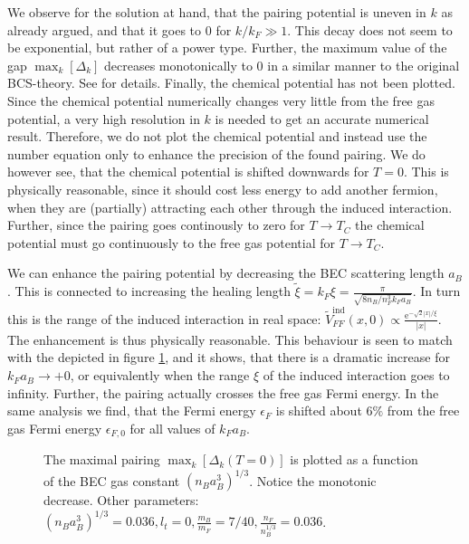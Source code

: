  We observe for the solution at hand, that the pairing potential is uneven in $k$ as already argued, and that it goes to 0 for $k/k_F \gg 1$. This decay does not seem to be exponential, but rather of a power type. Further, the maximum value of the gap $\max_k[\Delta_k]$ decreases monotonically to 0 in a similar manner to the original BCS-theory. See \cite{Tinkham,BruusFlensberg,PlischkeStatPhys} for details. Finally, the chemical potential has not been plotted. Since the chemical potential numerically changes very little from the free gas potential, a very high resolution in $k$ is needed to get an accurate numerical result. Therefore, we do not plot the chemical potential and instead use the number equation only to enhance the precision of the found pairing. We do however see, that the chemical potential is shifted downwards for $T=0$. This is physically reasonable, since it should cost less energy to add another fermion, when they are (partially) attracting each other through the induced interaction. Further, since the pairing goes continously to zero for $T\to T_C$ the chemical potential must go continuously to the free gas potential for $T\to T_C$. 

 We can enhance the pairing potential by decreasing the BEC scattering length $a_B$. This is connected to increasing the healing length $\tilde{\xi} = k_F\xi = \frac{\pi}{\sqrt{8 n_B/n_F^3 k_Fa_B}}$. In turn this is the range of the induced interaction in real space: $\tilde{V}_{FF}^\text{ind}(x,0) \propto \frac{\text{e}^{-\sqrt{2}|x|/\xi}}{|x|}$. The enhancement is thus physically reasonable. This behaviour is seen to match with the depicted in figure \ref{fig.maxkDeltakaBdepend}, and it shows, that there is a dramatic increase for $k_Fa_B \to +0$, or equivalently when the range $\xi$ of the induced interaction goes to infinity. Further, the pairing actually crosses the free gas Fermi energy. In the same analysis we find, that the Fermi energy $\epsilon_F$ is shifted about $6\%$ from the free gas Fermi energy $\epsilon_{F,0}$ for all values of $k_F a_B$.  

\begin{figure} 
\begin{center}  
  
\caption{The maximal pairing $\max_k[\Delta_k(T=0)]$ is plotted as a function of the BEC gas constant $(n_Ba_B^3)^{1/3}$. Notice the monotonic decrease. Other parameters: $(n_Ba_B^3)^{1/3} = 0.036, l_t = 0, \frac{m_B}{m_F} = 7/40, \frac{n_F}{n_B^{1/3}} = 0.036$.}  
\label{fig.maxkDeltakaBdepend}  
\end{center}    
\end{figure}


